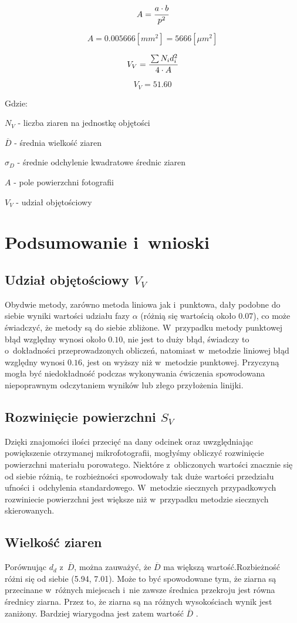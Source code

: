 \documentclass[a4paper,12pt]{article}
\begin{document}
$$A=\cfrac{a\cdot b}{p^2}$$

$$A=0.005666[mm^2]=5666[\mu m^2]$$

$$V_V=\cfrac{\sum N_id_i^2}{4\cdot A}$$

$$V_V=51.60$$

Gdzie:

$N_V$ - liczba ziaren na jednostkę objętości

$\overline{D}$ - średnia wielkość ziaren

$\sigma_D$ - średnie odchylenie kwadratowe średnic ziaren

$A$ - pole powierzchni fotografii

$V_V$ - udział objętościowy

\section{Podsumowanie i~wnioski}

\subsection{Udział objętościowy $V_V$}



Obydwie metody, zarówno metoda liniowa jak i~punktowa, dały podobne  do siebie wyniki wartości udziału fazy $\alpha$ (różnią się wartością około $0.07$), co może świadczyć, że metody są do siebie zbliżone. W~przypadku metody punktowej błąd względny wynosi  około $0.10$, nie jest to duży błąd, świadczy to  o~dokładności przeprowadzonych obliczeń, natomiast w~metodzie liniowej błąd względny wynosi  $0.16$, jest on wyższy niż w~metodzie punktowej. Przyczyną mogła być niedokładność  podczas wykonywania  ćwiczenia spowodowana niepoprawnym odczytaniem wyników lub złego przyłożenia linijki.

\subsection{Rozwinięcie powierzchni $S_V$}



Dzięki znajomości ilości przecięć na dany odcinek oraz uwzględniając powiększenie otrzymanej mikrofotografii, mogłyśmy obliczyć rozwinięcie powierzchni materiału porowatego. Niektóre z~obliczonych wartości znacznie się od siebie różnią, te rozbieżności spowodowały tak duże wartości przedziału ufności i~odchylenia standardowego. W~metodzie siecznych przypadkowych rozwiniecie powierzchni jest większe niż w~przypadku metodzie siecznych skierowanych.

\subsection{Wielkość ziaren}
Porównując $d_d$ z~$\overline{D}$, można zauważyć, że $\overline{D}$ ma większą wartość.Rozbieżność różni się od siebie (5.94, 7.01). Może to być spowodowane tym, że ziarna są  przecinane w~różnych miejscach i~nie zawsze średnica przekroju jest równa średnicy ziarna. Przez to, że ziarna są na różnych wysokościach wynik jest zaniżony. Bardziej wiarygodna jest zatem wartość $\overline{D}$ .
\end{document}
